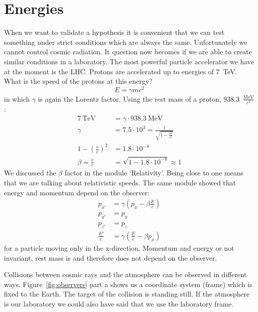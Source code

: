 \documentclass[12pt,a4paper]{article}
\numberwithin{equation}{section}
\numberwithin{figure}{section}
\numberwithin{table}{section}
\begin{document}
\section{Energies}
When we want to validate a hypothesis it is convenient that we can test something under strict conditions which are always the same. Unfortunately we cannot control cosmic radiation. It question now becomes if we are able to create similar conditions in a laboratory. The most powerful particle accelerator we have at the moment is the LHC. Protons are accelerated up to energies of 7~TeV. What is the speed of the protons at this energy?
\begin{equation}
E=\gamma m c^2
\end{equation}
in which $\gamma$ is again the Lorentz factor.%
Using the rest mass of a proton, 938.3~$\frac{\mbox{MeV}}{c^2}$:
\begin{align}
7~\mbox{TeV} &= \gamma \cdot 938.3~\mbox{MeV} \\
\gamma &= 7.5 \cdot 10^3 = \frac{1}{\sqrt{1-\frac{v^2}{c^2}}} \\
1 - \left( \frac{v}{c} \right)^2 &= 1.8 \cdot 10^{-8} \\
\beta = \frac{v}{c} &= \sqrt{1 - 1.8 \cdot 10^{-8}} \approx 1
\end{align}
We discussed the $\beta$ factor in the module `Relativity'. Being close to one means that we are talking about relativistic speeds. The same module showed that energy and momentum depend on the observer:
\begin{align}
p_{x'} &= \gamma \left( p_x - \beta \frac{E}{c} \right) \\
p_{y'} &= p_y \\
p_{z'} &= p_z \\
\frac{E'}{c} &= \gamma \left( \frac{E}{c} - \beta p_x \right) 
\end{align}
for a particle moving only in the x-direction. Momentum and energy or not invariant, rest mass is and therefore does not depend on the observer.

Collisions between cosmic rays and the atmosphere can be observed in different ways. Figure~\ref{fig:observers} part a shows us a coordinate system (frame) which is fixed to the Earth. The target of the collision is standing still. If the atmosphere is our laboratory we could also have said that we use the laboratory frame.
\end{document}
